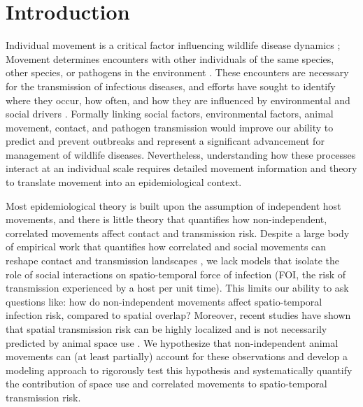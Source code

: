 ﻿\documentclass[11pt]{article}
\begin{document}
\newpage{}

\section*{Introduction}

Individual movement is a critical factor influencing wildlife disease dynamics \citep{Dougherty2018,Manlove2022};
Movement determines encounters with other individuals of the same species, other species, or pathogens in the environment \citep{Martinez-Garcia2020,Das2023}. 
These encounters are necessary for the transmission of infectious diseases, and efforts have sought to identify where they occur, how often, and how they are influenced by environmental and social drivers \citep{Titcomb2021,Dougherty2022,Webber2023}. 
Formally linking social factors, environmental factors, animal movement, contact, and pathogen transmission would improve our ability to predict and prevent outbreaks and represent a significant advancement for management of wildlife diseases.  
Nevertheless, understanding how these processes interact at an individual scale requires detailed movement information and theory to translate movement into an epidemiological context.


Most epidemiological theory is built upon the assumption of independent host movements, and there is little theory that quantifies how non-independent, correlated movements affect contact and transmission risk. Despite a large body of empirical work that quantifies how correlated and social movements can reshape contact and transmission landscapes \citep[e.g.,][]{Kjaer2008,Grear2010,Schauber2015a}, we lack models that isolate the role of social interactions on spatio-temporal force of infection (FOI, the risk of transmission experienced by a host per unit time). This limits our ability to ask questions like: how do non-independent movements affect spatio-temporal infection risk, compared to spatial overlap? Moreover, recent studies have shown that spatial transmission risk can be highly localized \citep{Albery2021} and is not necessarily predicted by animal space use \citep{Yang2023a}. We hypothesize that non-independent animal movements can (at least partially) account for these observations and develop a modeling approach to rigorously test this hypothesis and systematically quantify the contribution of space use and correlated movements to spatio-temporal transmission risk.
\end{document}
